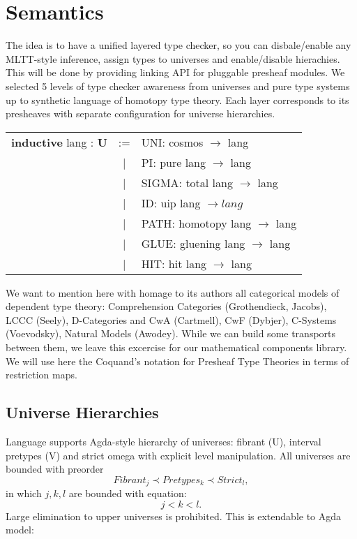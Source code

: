 \documentclass[a4paper,UKenglish,cleveref, autoref, thm-restate]{lipics-v2021}
\begin{document}
\newpage
\section{Semantics}
The idea is to have a unified layered type checker, so you can disbale/enable any MLTT-style inference, assign types to universes and enable/disable hierachies. This will be done by providing linking API for pluggable presheaf modules. We selected 5 levels of type checker awareness from universes and pure type systems up to synthetic language of homotopy type theory. Each layer corresponds to its presheaves with separate configuration for universe hierarchies.
\begin{table}[ht]
\begin{tabular}{rcl}
 \textbf{inductive} lang : \textbf{U} & := & UNI: cosmos $\rightarrow$ lang \\
   & | & PI: pure lang $\rightarrow$ lang \\
   & | & SIGMA: total lang $\rightarrow$ lang \\
   & | & ID: uip lang $\rightarrow lang$ \\
   & | & PATH: homotopy lang $\rightarrow$ lang \\
   & | & GLUE: gluening lang $\rightarrow$ lang \\
   & | & HIT: hit lang $\rightarrow$ lang \\
\end{tabular}
\end{table}
We want to mention here with homage to its authors all categorical models of dependent type theory: Comprehension Categories (Grothendieck, Jacobs), LCCC (Seely), D-Categories and CwA (Cartmell), CwF (Dybjer), C-Systems (Voevodsky), Natural Models (Awodey). While we can build some transports between them, we leave this excercise for our mathematical components library.
We will use here the Coquand's notation for Presheaf Type Theories in terms of restriction maps.

\subsection{Universe Hierarchies}

Language supports Agda-style hierarchy of universes: fibrant (U), interval pretypes (V) and strict omega
with explicit level manipulation. All universes are bounded with preorder
\begin{equation}
Fibrant_j \prec Pretypes_k \prec Strict_l,
\end{equation}
in which $j,k,l$ are bounded with equation:
\begin{equation}
j < k < l.
\end{equation}
Large elimination to upper universes is prohibited. This is extendable to Agda model:
\end{document}
